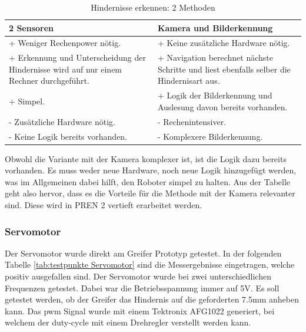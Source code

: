 \begin{table}[H]
\centering
\small
\begin{tabularx}{\textwidth}{|X|X|}
        \hline
        \textbf{2 Sensoren} & \textbf{Kamera und Bilderkennung}\\
        \hline
        + Weniger Rechenpower nötig. & + Keine zusätzliche Hardware nötig.  \\ \hline
        + Erkennung und Unterscheidung der Hindernisse wird auf nur einem Rechner durchgeführt.  & + Navigation berechnet nächste Schritte und liest ebenfalls selber die Hindernisart aus.  \\ \hline
        + Simpel. & + Logik der Bilderkennung und Auslesung davon bereits vorhanden. \\ \hline 
        - Zusätzliche Hardware nötig. & - Rechenintensiver.\\ \hline
        - Keine Logik bereits vorhanden. & - Komplexere Bilderkennung.  \\ \hline

\end{tabularx}
    \caption{Hindernisse erkennen: 2 Methoden}
\label{tab:obstacle-sensor}
\end{table}

Obwohl die Variante mit der Kamera komplexer ist, ist die Logik dazu bereits vorhanden. Es muss weder neue Hardware, noch neue Logik hinzugefügt werden, was im Allgemeinen dabei hilft, den Roboter simpel zu halten. Aus der Tabelle geht also hervor, dass es die Vorteile für die Methode mit der Kamera relevanter sind. Diese wird in PREN 2 vertieft erarbeitet werden.

\subsubsection*{Servomotor}


Der Servomotor wurde direkt am Greifer Prototyp getestet. In der folgenden Tabelle \ref{tab:testpunkte Servomotor} sind die Messergebnisse eingetragen, welche positiv ausgefallen sind. Der Servomotor wurde bei zwei unterschiedlichen Frequenzen getestet. Dabei war die Betriebsspannung immer auf 5V. Es soll getestet werden, ob der Greifer das Hindernis auf die geforderten 7.5mm anheben kann. Das \acrshort{pwm} Signal wurde mit einem Tektronix AFG1022 generiert, bei welchem der \gls{duty-cycle} mit einem Drehregler verstellt werden kann.

